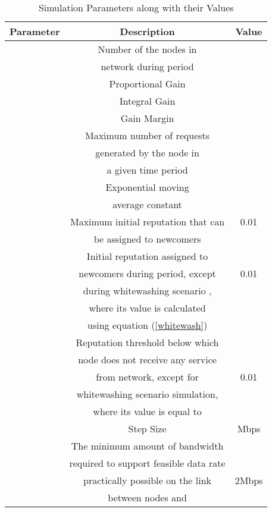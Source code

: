 \documentclass[journal]{IEEEtran}
\begin{document}
\begin{table}[]
	\caption{Simulation Parameters along with their Values}
	\centering
	\begin{tabular}{ |c|c|c|}
		\hline
		\textbf{Parameter}  &\textbf{Description} &\textbf{Value} \\
		\hline
		&Number of the nodes in   & \\ 
		    &network  during  period & \\ 
		\hline
		   &Proportional Gain     & \\
		\hline
		   &Integral Gain     & \\
		\hline
		   &Gain Margin     & \\
		\hline
		&Maximum number of  requests   & \\
		 &generated by the node in     & \\
		& a given time period     & \\
		\hline
		   &Exponential moving     & \\
		&average constant & \\
		\hline
		& Maximum initial reputation that can  &0.01\\ 
		               & be assigned to newcomers &  \\
		\hline 
		&  Initial reputation assigned to   &\\
		& newcomers during  period, except  &0.01  \\  
		       &  during  whitewashing scenario , &\\
		&   where its value is calculated   & \\
		& using  equation (\ref{whitewash}) &\\
		
		\hline
		& Reputation threshold below which &\\
		& node does not receive any service  &\\
		    & from network, except for  &0.01\\
		&  whitewashing scenario  simulation,  &\\
		&  where its value is equal to   &\\
		\hline
		   &Step Size     &Mbps \\
		\hline
		&  The minimum amount of bandwidth    & \\
		& required to support feasible data rate  & \\   
		              & practically possible on the link&2Mbps\\
		&  between nodes  and  &\\
		\hline
	\end{tabular}
	\label{sim_tab}
\end{table}       
\end{document}
